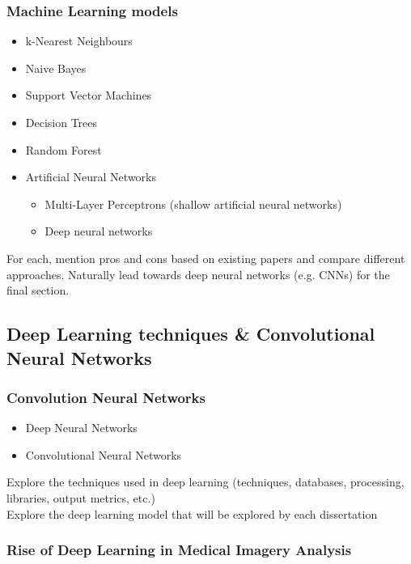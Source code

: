 \documentclass[letterpaper,12pt]{article}
\begin{document}
\subsubsection{Machine Learning models}

\begin{itemize}
    \item k-Nearest Neighbours
    \item Naive Bayes
    \item Support Vector Machines
    \item Decision Trees
    \item Random Forest
    \item Artificial Neural Networks
    \begin{itemize}
        \item Multi-Layer Perceptrons (shallow artificial neural networks)
        \item Deep neural networks
    \end{itemize}
\end{itemize}

For each, mention pros and cons based on existing papers and compare different approaches. Naturally lead towards deep neural networks (e.g. CNNs) for the final section.


\subsection{Deep Learning techniques \& Convolutional Neural Networks}

\subsubsection{Convolution Neural Networks}

\begin{itemize}
    \item Deep Neural Networks
    \item Convolutional Neural Networks
\end{itemize}

Explore the techniques used in deep learning (techniques, databases, processing, libraries, output metrics, etc.)\\
Explore the deep learning model that will be explored by each dissertation

\subsubsection{Rise of Deep Learning in Medical Imagery Analysis}
\end{document}
